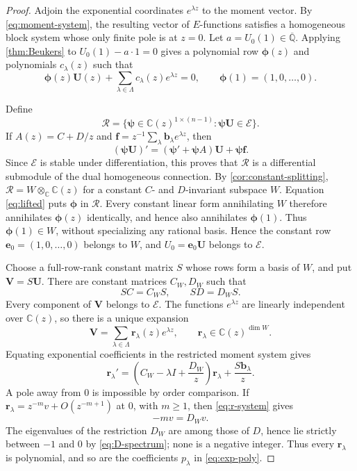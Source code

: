 \documentclass[11pt]{article}
\numberwithin{equation}{section}
\theoremstyle{definition}
\theoremstyle{remark}
\newcommand{\C}{\mathbb C}
\newcommand{\Qbar}{\overline{\mathbb Q}}
\newcommand{\Ecal}{\mathcal E}
\newcommand{\Rcal}{\mathcal R}
\begin{document}
\begin{proof}
Adjoin the exponential coordinates $e^{\lambda z}$ to the moment vector.
By \eqref{eq:moment-system}, the resulting vector of $E$-functions
satisfies a homogeneous block system whose only finite pole is at $z=0$.
Let $a=U_0(1)\in\Qbar$.  Applying \cref{thm:Beukers} to
$U_0(1)-a\cdot1=0$ gives a polynomial row
$\boldsymbol\phi(z)$ and polynomials $c_\lambda(z)$ such that
\begin{equation}\label{eq:lifted}
  \boldsymbol\phi(z)\mathbf U(z)
  +\sum_{\lambda\in\Lambda}c_\lambda(z)e^{\lambda z}=0,
  \qquad
  \boldsymbol\phi(1)=(1,0,\ldots,0).
\end{equation}

Define
\[
  \Rcal=
  \{\boldsymbol\psi\in\C(z)^{1\times(n-1)}:
    \boldsymbol\psi\mathbf U\in\Ecal\}.
\]
If $A(z)=C+D/z$ and
$\mathbf f=z^{-1}\sum_\lambda\mathbf b_\lambda e^{\lambda z}$, then
\[
  (\boldsymbol\psi\mathbf U)'
  =(\boldsymbol\psi'+\boldsymbol\psi A)\mathbf U
   +\boldsymbol\psi\mathbf f.
\]
Since $\Ecal$ is stable under differentiation, this proves that $\Rcal$
is a differential submodule of the dual homogeneous connection.  By
\cref{cor:constant-splitting},
$\Rcal=W\otimes_\C\C(z)$ for a constant $C$- and $D$-invariant subspace
$W$.  Equation \eqref{eq:lifted} puts $\boldsymbol\phi$ in $\Rcal$.
Every constant linear form annihilating $W$ therefore annihilates
$\boldsymbol\phi(z)$ identically, and hence also annihilates
$\boldsymbol\phi(1)$.  Thus $\boldsymbol\phi(1)\in W$, without
specializing any rational basis.  Hence the constant row
$\mathbf e_0=(1,0,\ldots,0)$ belongs to $W$, and
$U_0=\mathbf e_0\mathbf U$ belongs to $\Ecal$.

Choose a full-row-rank constant matrix $S$ whose rows form a basis of $W$,
and put $\mathbf V=S\mathbf U$.  There are constant matrices $C_W,D_W$
such that
\[
  SC=C_WS,
  \qquad SD=D_WS.
\]
Every component of $\mathbf V$ belongs to $\Ecal$.  The functions
$e^{\lambda z}$ are linearly independent over $\C(z)$, so there is a unique
expansion
\[
  \mathbf V=\sum_{\lambda\in\Lambda}
  \mathbf r_\lambda(z)e^{\lambda z},
  \qquad \mathbf r_\lambda\in\C(z)^{\dim W}.
\]
Equating exponential coefficients in the restricted moment system gives
\begin{equation}\label{eq:r-system}
  \mathbf r_\lambda'
  =\left(C_W-\lambda I+\frac{D_W}{z}\right)
     \mathbf r_\lambda
   +\frac{S\mathbf b_\lambda}{z}.
\end{equation}
A pole away from $0$ is impossible by order comparison.  If
$\mathbf r_\lambda=z^{-m}v+O(z^{-m+1})$ at $0$, with $m\ge1$, then
\eqref{eq:r-system} gives
\[
  -mv=D_Wv.
\]
The eigenvalues of the restriction $D_W$ are among those of $D$, hence lie
strictly between $-1$ and $0$ by \eqref{eq:D-spectrum}; none is a negative
integer.  Thus every $\mathbf r_\lambda$ is polynomial, and so are the
coefficients $p_\lambda$ in \eqref{eq:exp-poly}.


\end{proof}
\end{document}
